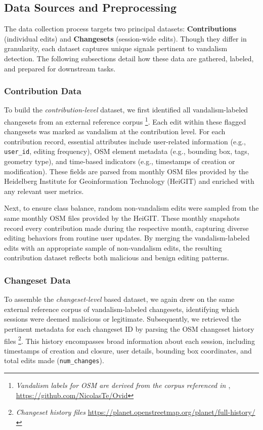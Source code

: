 \documentclass[
    13pt, %
    a4paper, %
    DIV14, %
    listof=totoc, %
    bibliography=totoc, %
    index=totoc, %
    headsepline
]{scrreprt}
\begin{document}
\subsection{Data Sources and Preprocessing}
\label{sec:data_sources_preprocessing}

The data collection process targets two principal datasets: \textbf{Contributions} (individual edits) and \textbf{Changesets} (session-wide edits). Though they differ in granularity, each dataset captures unique signals pertinent to vandalism detection. The following subsections detail how these data are gathered, labeled, and prepared for downstream tasks.

\subsubsection{Contribution Data}
\label{sec:contributions_data}

To build the \emph{contribution-level} dataset, we first identified all vandalism-labeled changesets from an external reference corpus \footnote{\emph{Vandalism labels for OSM are derived from the corpus referenced in \cite{Yuan2022}}, \url{https://github.com/NicolasTe/Ovid}}. Each edit within these flagged changesets was marked as vandalism at the contribution level. For each contribution record, essential attributes include user-related information (e.g., \texttt{user\_id}, editing frequency), OSM element metadata (e.g., bounding box, tags, geometry type), and time-based indicators (e.g., timestamps of creation or modification). These fields are parsed from monthly OSM files provided by the Heidelberg Institute for Geoinformation Technology (HeiGIT) and enriched with any relevant user metrics.

Next, to ensure class balance, random non-vandalism edits were sampled from the same monthly OSM files provided by the HeiGIT. These monthly snapshots record every contribution made during the respective month, capturing diverse editing behaviors from routine user updates. By merging the vandalism-labeled edits with an appropriate sample of non-vandalism edits, the resulting contribution dataset reflects both malicious and benign editing patterns.

\subsubsection{Changeset Data}
\label{sec:changesets_data}

To assemble the \emph{changeset-level} based dataset, we again drew on the same external reference corpus of vandalism-labeled changesets, identifying which sessions were deemed malicious or legitimate. Subsequently, we retrieved the pertinent metadata for each changeset ID by parsing the OSM changeset history files \footnote{\emph{Changeset history files} \url{https://planet.openstreetmap.org/planet/full-history/}}. This history encompasses broad information about each session, including timestamps of creation and closure, user details, bounding box coordinates, and total edits made (\texttt{num\_changes}).
\end{document}
